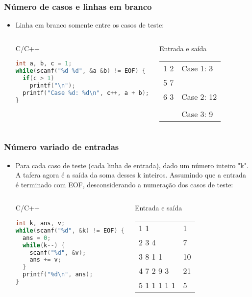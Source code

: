 \begin{frame} [fragile]
  \frametitle{Número de casos e linhas em branco}
    \begin{itemize}
      \item {\small Linha em branco somente entre os casos de teste:}
      \begin{columns}
      \begin{block:ie}{C/C++}
	\begin{lstlisting}[language=c]
int a, b, c = 1;
while(scanf("%d %d", &a &b) != EOF) {
  if(c > 1)
    printf("\n");
  printf("Case %d: %d\n", c++, a + b);
}
	\end{lstlisting}
      \end{block:ie}

      \begin{block:ie}{Entrada e saída} \scriptsize
	\begin{tabularx}{\textwidth}{|X|X|}
	  1 2&Case 1: 3\\5 7&\\6 3&Case 2: 12\\&\\&Case 3: 9
	\end{tabularx}
      \end{block:ie}
    \end{columns}
  \end{itemize}
\end{frame}

\begin{frame} [fragile]
  \frametitle{Número variado de entradas}
    \begin{itemize}
      \item {\small Para cada caso de teste (cada linha de entrada), dado um número inteiro "k". A tafera agora é a saída da soma desses k inteiros. Assumindo que a entrada é terminado com EOF, desconsiderando a numeração dos casos de teste:}
      \begin{columns}
      \begin{block:ie}{C/C++}
	\begin{lstlisting}[language=c]
int k, ans, v;
while(scanf("%d", &k) != EOF) {
  ans = 0;
  while(k--) {
    scanf("%d", &v);
    ans += v;
  }
  printf("%d\n", ans);
}
	\end{lstlisting}
      \end{block:ie}

      \begin{block:ie}{Entrada e saída}\small
	\begin{tabularx}{\textwidth}{|X|X|}
	 1 1&1\\2 3 4&7\\3 8 1 1&10\\4 7 2 9 3&21\\5 1 1 1 1 1&5
	\end{tabularx}
      \end{block:ie}
    \end{columns}
  \end{itemize}
\end{frame}
